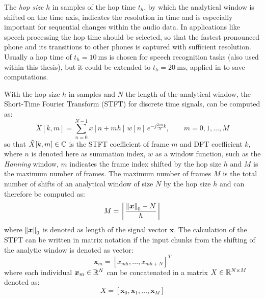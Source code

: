 The \emph{hop size} $h$ in samples of the hop time $t_h$, by which the analytical window is shifted on the time axis, indicates the resolution in time and is especially important for sequential changes within the audio data.
In applications like speech processing the hop time should be selected, so that the fastest pronounced phone and its transitions to other phones is captured with sufficient resolution.
Usually a hop time of $t_{h}=\SI{10}{\milli\second}$ is chosen for speech recognition tasks (also used within this thesis), but it could be extended to $t_{h}=\SI{20}{\milli\second}$, applied in \cite{Peter2020} to save computations.

With the hop size $h$ in samples and $N$ the length of the analytical window, the Short-Time Fourier Transform (STFT) for discrete time signals, can be computed as:
\begin{equation}\label{eq:signal_spec_stft}
    \tilde{X}[k, m] = \sum_{n=0}^{N-1} x[n + m h] \, w[n] \, e^{-j\frac{2 \pi n}{N}k}, \qquad m = 0, 1, \dots, M
\end{equation}
so that $\tilde{X}[k, m] \in \C$ is the STFT coefficient of frame $m$ and DFT coefficient $k$, where $n$ is denoted here as summation index, $w$ as a window function, such as the \emph{Hanning} window, $m$ indicates the frame index shifted by the hop size $h$ and $M$ is the maximum number of frames.
The maximum number of frames $M$ is the total number of shifts of an analytical window of size $N$ by the hop size $h$ and can therefore be computed as:
\begin{equation}\label{eq:signal_spec_hop}
  M = \ceil*{\frac{\norm{\bm{x}}_0-N}{h}}
\end{equation}
where $\norm{\bm{x}}_0$ is denoted as length of the signal vector $\bm{x}$.
The calculation of the STFT can be written in matrix notation if the input chunks from the shifting of the analytic window is denoted as vector:
\begin{equation}
  \bm{x}_m = [x_{m h}, \dots, x_{m h+N}]^T
\end{equation}
where each individual $\bm{x}_m \in \R^N$ can be concatenated in a matrix $X \in \R^{N \times M}$ denoted as:
\begin{equation}
  X = [\bm{x}_0, \bm{x}_1, \dots, \bm{x}_M]
\end{equation}
